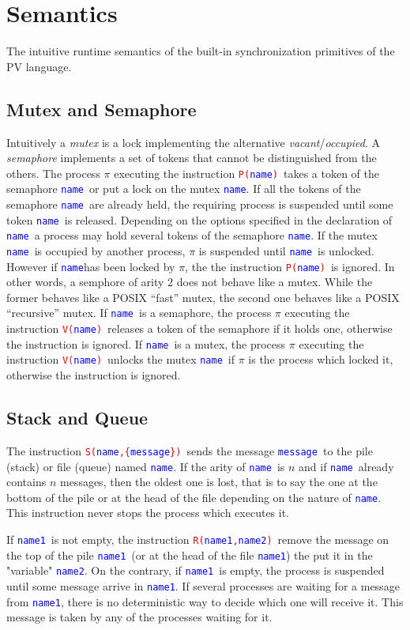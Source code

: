 \documentclass[article,11pt]{amsbook}
\def\wrn#1{\textcolor{red}{#1}}
\def\hil#1{\textcolor{blue}{#1}}
\def\posix{{\sf POSIX} }
\def\pv{{\sf PV} }
\def\name{{\hil{\texttt{\scriptsize name}}}}
\def\namei{{\hil{\texttt{\scriptsize name1}}}}
\def\nameii{{\hil{\texttt{\scriptsize name2}}}}
\def\message{{\hil{\texttt{\scriptsize message}}}}
\def\rulecall#1{\hil{{\texttt{#1}}}}
\def\kw#1{\wrn{\texttt{#1}}}
\def\lockmtx#1{{\scriptsize
\kw{P(}\rulecall{{#1}}\kw{)}}}
\def\unlkmtx{{\scriptsize
\kw{V(}\rulecall{name}\kw{)}}}
\def\sendmess#1#2{{\scriptsize
\kw{S(}\rulecall{{#1}}\kw{,\{}\rulecall{{#2}}\kw{\})}}}
\def\recvmess{{\scriptsize
\kw{R(}\rulecall{name1}\kw{,}\rulecall{name2}\kw{)}}}
\begin{document}
\section{Semantics}
The intuitive runtime semantics of the built-in synchronization
primitives of the \pv language.
\subsection{Mutex and Semaphore}Intuitively a {\em mutex} is a lock
implementing the alternative {\em vacant}/{\em occupied}. A {\em
semaphore} implements a set of tokens that cannot be distinguished from
the others. The process $\pi$ executing the instruction \lockmtx{name}\
takes a token of the semaphore \name\ or put a lock on the mutex
\name. If all the tokens of the semaphore \name\ are already held, the
requiring process is suspended until some token \name\ is
released. Depending on the options specified in the declaration of
\name\ a process may hold several tokens of the semaphore \name. If the
mutex \name\ is occupied by another process, $\pi$ is suspended until
\name\ is unlocked. However if \name has been locked by $\pi$, the the
instruction \lockmtx{name}\ is ignored. In other words, a semphore of
arity $2$ does not behave like a mutex. While the former behaves like a
\posix ``fast'' mutex, the second one behaves like a \posix
``recursive'' mutex. If \name\ is a semaphore, the process $\pi$
executing the instruction \unlkmtx\ releases a token of the semaphore if
it holds one, otherwise the instruction is ignored. If \name\ is a
mutex, the process $\pi$ executing the instruction \unlkmtx\ unlocks the
mutex \name\ if $\pi$ is the process which locked it, otherwise the
instruction is ignored.
\subsection{Stack and Queue}
The instruction \sendmess{name}{message}\ sends the message \message\ to
    the pile (stack) or file (queue) named \name. If the arity of \name\
    is $n$ and if \name\ already contains $n$ messages, then the oldest
    one is lost, that is to say the one at the bottom of the pile or at
    the head of the file depending on the nature of \name. This
    instruction never stops the process which executes it.

If \namei\ is not empty, the instruction \recvmess\ remove the message on
the top of the pile \namei\ (or at the head of the file \namei) the put
it in the "variable" \nameii. On the contrary, if \namei\ is empty, the
process is suspended until some message arrive in \namei. If several
processes are waiting for a message from \namei, there is no
deterministic way to decide which one will receive it. This message is
taken by any of the processes waiting for it.
\end{document}

